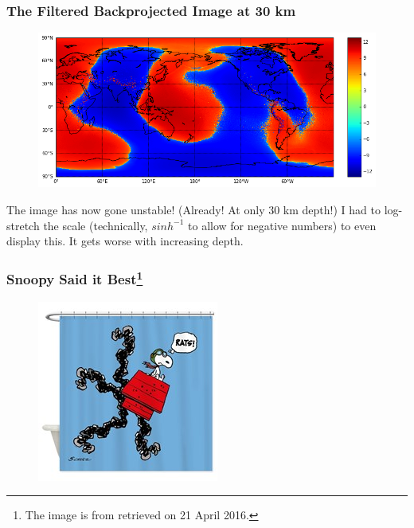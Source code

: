\documentclass[aspectratio=43,mathserif]{beamer}
\begin{document}
\begin{frame}

\frametitle{The Filtered Backprojected Image at 30 km}

\begin{figure}
\includegraphics[width=0.9\linewidth]{FBP30.png}
\end{figure}

The image has now gone unstable! (Already! At only 30 km depth!) I had to log-stretch the scale (technically, \(sinh^{-1}\) to allow for negative numbers) to even display this. It gets worse with increasing depth.
\end{frame}

\begin{frame}
\frametitle{Snoopy Said it Best\footnote{The image is from  retrieved on 21 April 2016.}}

\begin{figure}
\includegraphics[width=0.5\linewidth]{flying_ace_rats_shower_curtain.jpg}
\end{figure}

\end{frame}
\end{document}
